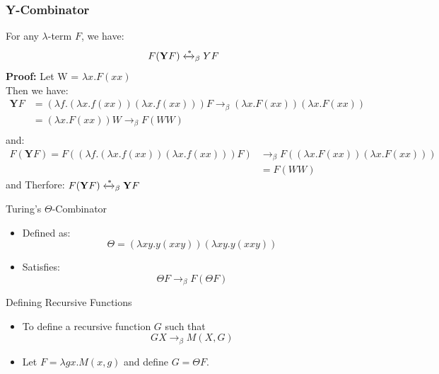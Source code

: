 \documentclass{beamer}
\begin{document}
\begin{frame}
  \frametitle{Y-Combinator}
  \begin{lemma}
    
    For any \(\lambda\)-term \(F\), we have:
    \vspace{-0.5em}
    \[
      F(\mathbf{Y} F) \xleftrightarrow{*}_\beta Y F
    \]
    \textbf{Proof:}
    Let W = \(\lambda x. F (x x)\)\\
    Then we have:
    \[
      \begin{aligned}
      \mathbf{Y} F &= (\lambda f. (\lambda x. f (x x)) (\lambda x. f (x x))) F
      \rightarrow_\beta (\lambda x. F (x x)) (\lambda x. F (x x)) \\
      &= (\lambda x. F (x x))W       \rightarrow_\beta F(W W) \\
    \end{aligned}
    \]
    and:
    \[
      \begin{aligned}
      F(\mathbf{Y} F) = F((\lambda f. (\lambda x. f (x x)) (\lambda x. f (x x))) F) &\rightarrow_\beta F((\lambda x. F (x x)) (\lambda x. F (x x))) \\
      &= F(WW)
      \end{aligned}
    \]
    and Therfore: \(F(\mathbf{Y}F) \xleftrightarrow{*}_\beta \mathbf{Y}F\)
    
  \end{lemma}
\end{frame}

\begin{frame}{Turing's $\Theta$-Combinator}
  \begin{itemize}
    \item Defined as:
      \[
      \Theta = (\lambda x y. y(x x y)) (\lambda x y. y(x x y))
      \]
    \item Satisfies:
      \[
      \Theta F \rightarrow_\beta F (\Theta F)
      \]
  \end{itemize}
\end{frame}

\begin{frame}{Defining Recursive Functions}
  \begin{itemize}
    \item To define a recursive function \(G\) such that
      \[
      G X \rightarrow_\beta M(X, G)
      \]
    \item Let \(F = \lambda g x. M(x, g)\) and define \(G = \Theta F\).
  \end{itemize}
\end{frame}
\end{document}

